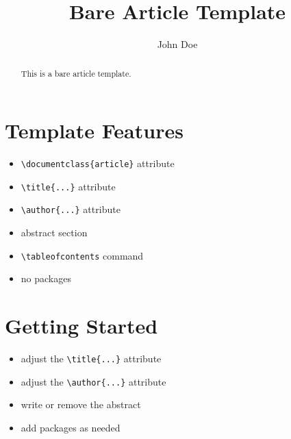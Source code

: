 \documentclass[12pt]{article}
\title{Bare Article Template}
\author{John Doe}
\begin{document}
\maketitle

\begin{abstract}
This is a bare
article
template.
\end{abstract}

\tableofcontents

\section{Template Features}

\begin{itemize}
\item \verb|\documentclass{article}| attribute
\item \verb|\title{...}| attribute
\item \verb|\author{...}| attribute
\item abstract section
\item \verb|\tableofcontents| command
\item no packages
\end{itemize}

\section{Getting Started}

\begin{itemize}
\item adjust the \verb|\title{...}| attribute
\item adjust the \verb|\author{...}| attribute
\item write or remove the abstract
\item add packages as needed
\end{itemize}
\end{document}
